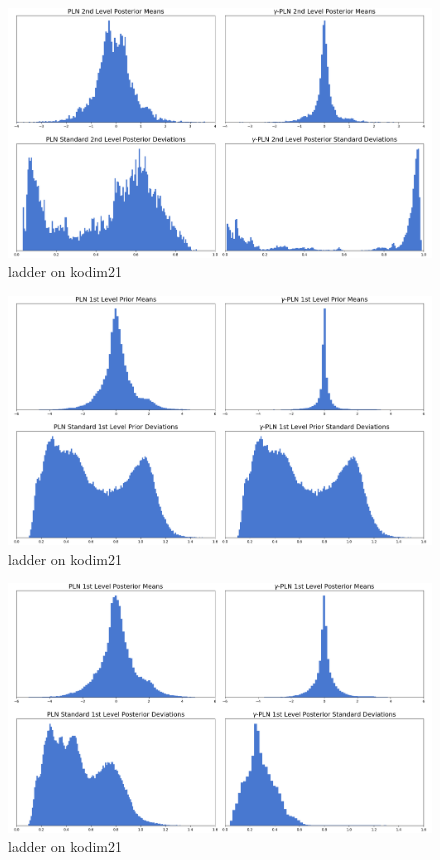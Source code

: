 \documentclass{article}
\begin{document}
\begin{figure}[H]
  \centering
  \includegraphics[width=\textwidth]{../img/plots/vae_latents/ladder_gamma_q2_comp}
  \caption{ladder on kodim21}
  \label{fig:ladder_gamma_q2_comp}
\end{figure}
\begin{figure}[H]
  \centering
  \includegraphics[width=\textwidth]{../img/plots/vae_latents/ladder_gamma_p1_comp}
  \caption{ladder on kodim21}
  \label{fig:ladder_gamma_p1_comp}
\end{figure}
\begin{figure}[H]
  \centering
  \includegraphics[width=\textwidth]{../img/plots/vae_latents/ladder_gamma_q1_comp}
  \caption{ladder on kodim21}
  \label{fig:ladder_gamma_q1_comp}
\end{figure}
\end{document}
